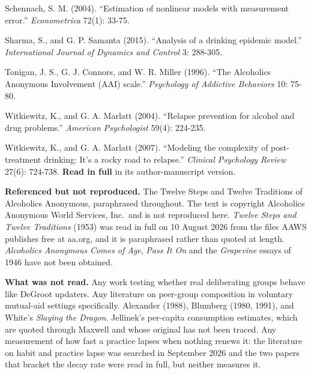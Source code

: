 \documentclass[11pt,a4paper]{article}
\begin{document}
\begin{list}{}{\setlength{\leftmargin}{1.5em}\setlength{\itemindent}{-1.5em}\setlength{\itemsep}{2pt}}
\item Schennach, S. M. (2004). ``Estimation of nonlinear models with measurement error.'' \textit{Econometrica} 72(1): 33-75.

\item Sharma, S., and G. P. Samanta (2015). ``Analysis of a drinking epidemic model.'' \textit{International Journal of Dynamics and Control} 3: 288-305.

\item Tonigan, J. S., G. J. Connors, and W. R. Miller (1996). ``The Alcoholics Anonymous Involvement (AAI) scale.'' \textit{Psychology of Addictive Behaviors} 10: 75-80.

\item Witkiewitz, K., and G. A. Marlatt (2004). ``Relapse prevention for alcohol and drug problems.'' \textit{American Psychologist} 59(4): 224-235.

\item Witkiewitz, K., and G. A. Marlatt (2007). ``Modeling the complexity of post-treatment drinking: It's a rocky road to relapse.'' \textit{Clinical Psychology Review} 27(6): 724-738. \textbf{Read in full} in its author-manuscript version.

\end{list}

\medskip
\noindent\textbf{Referenced but not reproduced.} The Twelve Steps and Twelve
Traditions of Alcoholics Anonymous, paraphrased throughout. The text is copyright
Alcoholics Anonymous World Services, Inc.\ and is not reproduced here. \textit{Twelve Steps
and Twelve Traditions} (1953) was read in full on 10 August 2026 from the files
AAWS publishes free at aa.org, and it is paraphrased rather than quoted at length.
\textit{Alcoholics Anonymous Comes of Age}, \textit{Pass It On} and the
\textit{Grapevine} essays of 1946 have not been obtained.

\medskip
\noindent\textbf{What was not read.} Any work testing whether real deliberating
groups behave like DeGroot updaters. Any literature on peer-group composition in
voluntary mutual-aid settings specifically. Alexander (1988), Blumberg (1980,
1991), and White's \textit{Slaying the Dragon}.
Jellinek's per-capita consumption estimates, which are quoted through Maxwell and
whose original has not been traced. Any measurement of how fast a practice lapses when
nothing renews it: the literature on habit and practice lapse was searched in September 2026
and the two papers that bracket the decay rate were read in full, but neither measures it.
\end{document}
